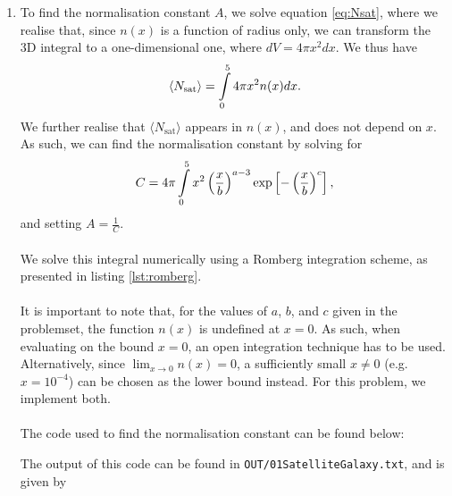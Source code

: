 \begin{enumerate}[label=(\alph*)]
\item {
	To find the normalisation constant $A$, we solve equation \eqref{eq:Nsat}, where we realise that, since $n(x)$ is a function of radius only, we can transform the 3D integral to a one-dimensional one, where $dV = 4\pi x^2 dx$. We thus have
\begin{equation}
	\langle N_\text{sat}\rangle = \int\limits_{0}^{5} 4\pi x^2 n(x) dx.
\end{equation}
We further realise that $\langle N_\text{sat} \rangle$ appears in $n(x)$, and does not depend on $x$. As such, we can find the normalisation constant by solving for
\begin{equation}
	C = 4\pi\int\limits_{0}^{5} x^2 \left(\frac{x}{b}\right)^{a-3} \exp\left[-\left(\frac{x}{b}\right)^c\right],
\end{equation}
and setting $A = \frac{1}{C}$.\\
\\
We solve this integral numerically using a Romberg integration scheme, as presented in listing \ref{lst:romberg}. \\
\\
It is important to note that, for the values of $a$, $b$, and $c$ given in the problemset, the function $n(x)$ is undefined at $x=0$. As such, when evaluating on the bound $x=0$, an open integration technique has to be used. Alternatively, since $\lim_{x\rightarrow 0}n(x) = 0$, a sufficiently small $x\neq0$ (e.g. $x=10^{-4}$) can be chosen as the lower bound instead. For this problem, we implement both.\\
\\
The code used to find the normalisation constant can be found below:

The output of this code can be found in \verb|OUT/01SatelliteGalaxy.txt|, and is given by


}
\end{enumerate}
